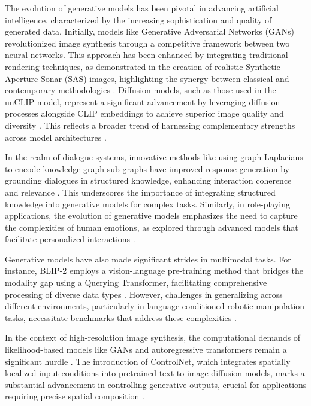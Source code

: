The evolution of generative models has been pivotal in advancing artificial intelligence, characterized by the increasing sophistication and quality of generated data. Initially, models like Generative Adversarial Networks (GANs) revolutionized image synthesis through a competitive framework between two neural networks. This approach has been enhanced by integrating traditional rendering techniques, as demonstrated in the creation of realistic Synthetic Aperture Sonar (SAS) images, highlighting the synergy between classical and contemporary methodologies \cite{reed2019couplingrenderinggenerativeadversarial}. Diffusion models, such as those used in the unCLIP model, represent a significant advancement by leveraging diffusion processes alongside CLIP embeddings to achieve superior image quality and diversity \cite{Hierarchic2}. This reflects a broader trend of harnessing complementary strengths across model architectures \cite{dhariwal2021diffusion}.



In the realm of dialogue systems, innovative methods like using graph Laplacians to encode knowledge graph sub-graphs have improved response generation by grounding dialogues in structured knowledge, enhancing interaction coherence and relevance \cite{chaudhuri2021groundingdialoguesystemsknowledge}. This underscores the importance of integrating structured knowledge into generative models for complex tasks. Similarly, in role-playing applications, the evolution of generative models emphasizes the need to capture the complexities of human emotions, as explored through advanced models that facilitate personalized interactions \cite{tao2024rolecraftglmadvancingpersonalizedroleplaying}.



Generative models have also made significant strides in multimodal tasks. For instance, BLIP-2 employs a vision-language pre-training method that bridges the modality gap using a Querying Transformer, facilitating comprehensive processing of diverse data types \cite{li2023blip}. However, challenges in generalizing across different environments, particularly in language-conditioned robotic manipulation tasks, necessitate benchmarks that address these complexities \cite{zhou2024languageconditionedimitationlearningbase}.



In the context of high-resolution image synthesis, the computational demands of likelihood-based models like GANs and autoregressive transformers remain a significant hurdle \cite{rombach2022high}. The introduction of ControlNet, which integrates spatially localized input conditions into pretrained text-to-image diffusion models, marks a substantial advancement in controlling generative outputs, crucial for applications requiring precise spatial composition \cite{zhang2023adding}.



